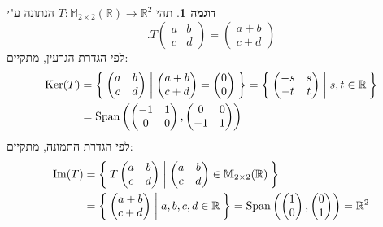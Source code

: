 \documentclass[12pt]{report}
\theoremstyle{plain}
\theoremstyle{definition}
\newtheorem{example}{דוגמה}[chapter]
\newcommand{\R}{\mathbb{R}}
\newcommand{\M}{\mathbb{M}}
\newcommand{\0}{\mathbf{0}}
\DeclareMathOperator{\Span}{Span}
\DeclareMathOperator{\Ker}{Ker}
\DeclareMathOperator{\Image}{Im}
\begin{document}
\begin{example}
תהי
$T:\M_{2\times 2}(\R)\to \R^2$
הנתונה ע"י
$$
.T\begin{pmatrix}
a & b \\
c & d
\end{pmatrix}=\begin{pmatrix}
a+b \\
c+d
\end{pmatrix}
$$
לפי הגדרת הגרעין, מתקיים:
$$
\begin{aligned}
\Ker(T)&=\Set{\begin{pmatrix}
a & b \\
c & d
\end{pmatrix}|\begin{pmatrix}
a+b \\
c+d
\end{pmatrix}=\begin{pmatrix}
0 \\
0
\end{pmatrix}}=\Set{\begin{pmatrix}
-s & s \\
-t & t
\end{pmatrix}|s,t\in \R} \\
&=\Span\left(\begin{pmatrix}
-1 & 1 \\
0 & 0
\end{pmatrix},\begin{pmatrix}
0 & 0 \\
-1 & 1
\end{pmatrix}\right)
\end{aligned}
$$
לפי הגדרת התמונה, מתקיים:
$$
\begin{aligned}
\Image(T)&=\Set{T\begin{pmatrix}
a & b \\
c & d
\end{pmatrix}|\begin{pmatrix}
a & b \\
c & d
\end{pmatrix}\in\M_{2\times 2}(\R)} \\
&=\Set{\begin{pmatrix}
a+b \\
c+d
\end{pmatrix}|a,b,c,d\in\R}=\Span\left(\begin{pmatrix}1\\0\end{pmatrix},\begin{pmatrix}0\\1\end{pmatrix}\right)=\R^2
\end{aligned}
$$
\end{example}
\end{document}

